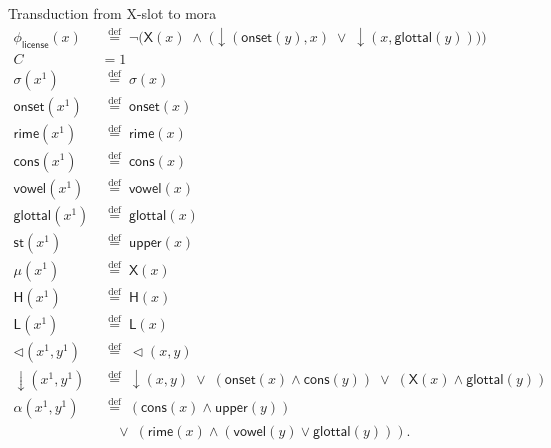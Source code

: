 \documentclass{article}
\newcommand{\defeq}{\stackrel{\mathrm{def}}{=}}
\begin{document}
Transduction from X-slot to mora 
\begin{align*}
\phi_{\textsf{license}}(x) 
  &\;\defeq\; 
    \lnot\Big(
      \mathsf{X}(x) \;\wedge\;
      \big(
        \downarrow(\mathsf{onset}(y), x) \;\vee\;
        \downarrow(x, \mathsf{glottal}(y))
      \big)
    \Big)\\
\textit{C} &= 1\\    
\sigma(x^1) &\;\defeq\; \sigma(x)\\
\mathsf{onset}(x^1) &\;\defeq\; \mathsf{onset}(x)\\
\mathsf{rime}(x^1) &\;\defeq\; \mathsf{rime}(x)\\
\mathsf{cons}(x^1) &\;\defeq\; \mathsf{cons}(x)\\
\mathsf{vowel}(x^1) &\;\defeq\; \mathsf{vowel}(x)\\
\mathsf{glottal}(x^1) &\;\defeq\; \mathsf{glottal}(x)\\
\mathsf{st}(x^1) &\;\defeq\; \mathsf{upper}(x)\\
\mathsf{\mu}(x^1) &\;\defeq\; \mathsf{X}(x)\\
\mathsf{H}(x^1) &\;\defeq\; \mathsf{H}(x)\\
\mathsf{L}(x^1) &\;\defeq\; \mathsf{L}(x)\\[6pt]
\lhd(x^1,y^1) &\;\defeq\; \lhd(x,y)\\
\downarrow(x^1,y^1)
   &\;\defeq\; 
      \downarrow(x,y) 
      \;\vee\; (\mathsf{onset}(x) \wedge \mathsf{cons}(y)) 
      \;\vee\; (\mathsf{X}(x) \wedge \mathsf{glottal}(y))\\
\alpha(x^1,y^1) 
   &\;\defeq\; 
      (\mathsf{cons}(x) \wedge \mathsf{upper}(y)) \\
   &\;\;\;\;\vee\; (\mathsf{rime}(x) \wedge (\mathsf{vowel}(y) \vee \mathsf{glottal}(y))).
\end{align*}
\end{document}
